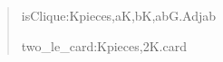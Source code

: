 \documentclass[english,11pt,a4paper]{article}
\newlength{\LeanCharWidth}
\begin{document}
\begin{quote}
\noindent \hspace*{\dimexpr 2\LeanCharWidth\relax}isClique\hspace*{\dimexpr 1\LeanCharWidth\relax}:\hspace*{\dimexpr 1\LeanCharWidth\relax}{\LeanSymbols ∀}\hspace*{\dimexpr 1\LeanCharWidth\relax}K\hspace*{\dimexpr 1\LeanCharWidth\relax}{\LeanSymbols ∈}\hspace*{\dimexpr 1\LeanCharWidth\relax}pieces,\hspace*{\dimexpr 1\LeanCharWidth\relax}{\LeanSymbols ∀}\hspace*{\dimexpr 1\LeanCharWidth\relax}a\hspace*{\dimexpr 1\LeanCharWidth\relax}{\LeanSymbols ∈}\hspace*{\dimexpr 1\LeanCharWidth\relax}K,\hspace*{\dimexpr 1\LeanCharWidth\relax}{\LeanSymbols ∀}\hspace*{\dimexpr 1\LeanCharWidth\relax}b\hspace*{\dimexpr 1\LeanCharWidth\relax}{\LeanSymbols ∈}\hspace*{\dimexpr 1\LeanCharWidth\relax}K,\hspace*{\dimexpr 1\LeanCharWidth\relax}a\hspace*{\dimexpr 1\LeanCharWidth\relax}{\LeanSymbols ≠}\hspace*{\dimexpr 1\LeanCharWidth\relax}b\hspace*{\dimexpr 1\LeanCharWidth\relax}{\LeanSymbols →}\hspace*{\dimexpr 1\LeanCharWidth\relax}G.Adj\hspace*{\dimexpr 1\LeanCharWidth\relax}a\hspace*{\dimexpr 1\LeanCharWidth\relax}b\par
\noindent \hspace*{\dimexpr 2\LeanCharWidth\relax}two\_le\_card\hspace*{\dimexpr 1\LeanCharWidth\relax}:\hspace*{\dimexpr 1\LeanCharWidth\relax}{\LeanSymbols ∀}\hspace*{\dimexpr 1\LeanCharWidth\relax}K\hspace*{\dimexpr 1\LeanCharWidth\relax}{\LeanSymbols ∈}\hspace*{\dimexpr 1\LeanCharWidth\relax}pieces,\hspace*{\dimexpr 1\LeanCharWidth\relax}2\hspace*{\dimexpr 1\LeanCharWidth\relax}{\LeanSymbols ≤}\hspace*{\dimexpr 1\LeanCharWidth\relax}K.card\par

\end{quote}
\end{document}
